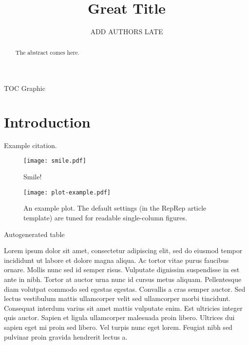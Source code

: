 \documentclass[journal=jctcce,manuscript=article,layout=traditional]{achemso}
\title{Great Title}
\author{ADD AUTHORS LATE}
\affiliation[Ghent University]{Center for Molecular Modeling (CMM), Ghent University, Technologiepark-Zwijnaarde 46, B-9052, Ghent, Belgium}
\begin{document}
    \begin{abstract}
         The abstract comes here.
    \end{abstract}

    \begin{tocentry}
        TOC Graphic
    \end{tocentry}

    \newpage

    \section{Introduction}
    \label{sec:introduction}

    Example citation.\cite{knuth:1984}

    \begin{figure}
        \begin{center}
            \texttt{[image: smile.pdf]}
        \end{center}
        \caption{Smile!}
        \label{fig:smile}
    \end{figure}

    \begin{figure}
        \begin{center}
            \texttt{[image: plot-example.pdf]}
        \end{center}
        \caption{
            An example plot.
            The default settings (in the RepRep article template)
            are tuned for readable single-column figures.
        }
        \label{fig:plot-example}
    \end{figure}

    \begin{table}
        \begin{center}
        
        \end{center}
        \label{tab:auto}
        \caption{Autogenerated table}
    \end{table}

    Lorem ipsum dolor sit amet, consectetur adipiscing elit, sed do eiusmod tempor incididunt ut labore et dolore magna aliqua.
    Ac tortor vitae purus faucibus ornare.
    Mollis nunc sed id semper risus.
    Vulputate dignissim suspendisse in est ante in nibh.
    Tortor at auctor urna nunc id cursus metus aliquam.
    Pellentesque diam volutpat commodo sed egestas egestas.
    Convallis a cras semper auctor.
    Sed lectus vestibulum mattis ullamcorper velit sed ullamcorper morbi tincidunt.
    Consequat interdum varius sit amet mattis vulputate enim.
    Est ultricies integer quis auctor.
    Sapien et ligula ullamcorper malesuada proin libero.
    Ultrices dui sapien eget mi proin sed libero.
    Vel turpis nunc eget lorem.
    Feugiat nibh sed pulvinar proin gravida hendrerit lectus a.
\end{document}
